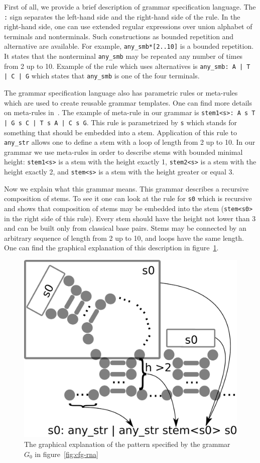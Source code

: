 \documentclass[a4paper,twoside]{article}
\begin{document}
First of all, we provide a brief description of grammar specification language.
The \verb|:| sign separates the left-hand side and the right-hand side of the rule.
In the right-hand side, one can use extended regular expressions over union alphabet of terminals and nonterminals.
Such constructions as bounded repetition and alternative are available.
For example, \verb|any_smb*[2..10]| is a bounded repetition. It states that the nonterminal \verb|any_smb| may be repeated any number of times from 2 up to 10.
Example of the rule which uses alternatives is \texttt{any\_smb: A | T | C | G} which states that \verb|any_smb| is one of the four terminals.

The grammar specification language also has parametric rules or meta-rules which are used to create reusable grammar templates.
One can find more details on meta-rules in~\cite{Thiemann:2008:MCG:1389449.1389465}.
The example of meta-rule in our grammar is \texttt{stem1<s>: A s T | G s C | T s A | C s G}.
This rule is parametrized by \verb|s| which stands for something that should be embedded into a stem.
Application of this rule to \verb|any_str| allows one to define a stem with a loop of length from 2 up to 10.
In our grammar we use meta-rules in order to describe stems with bounded minimal height: \verb|stem1<s>| is a stem with the height exactly 1,  \verb|stem2<s>| is a stem with the height exactly 2, and \verb|stem<s>| is a stem with the height greater or equal 3.

Now we explain what this grammar means.
This grammar describes a recursive composition of stems.
To see it one can look at the rule for \verb|s0| which is recursive and shows that composition of stems may be embedded into the stem (\verb|stem<s0>| in the right side of this rule).
Every stem should have the height not lower than 3 and can be built only from classical base pairs.
Stems may be connected by an arbitrary sequence of length from 2 up to 10, and loops have the same length.
One can find the graphical explanation of this description in figure~\ref{fig:cfg-rna-graphical}.

\begin{figure}
\centering
\includegraphics[width=.45\textwidth]{figures/16sgrammar.pdf}
\caption{The graphical explanation of the pattern specified by the grammar $G_0$ in figure~\ref{fig:cfg-rna}}
\label{fig:cfg-rna-graphical}
\end{figure}
\end{document}
